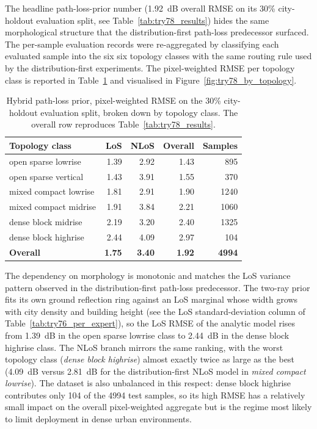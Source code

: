 The headline path-loss-prior number (\SI{1.92}{dB} overall RMSE on its
30\% city-holdout evaluation split, see Table~\ref{tab:try78_results}) hides the
same morphological structure that the distribution-first path-loss predecessor surfaced. The per-sample evaluation
records were re-aggregated by classifying each evaluated sample into the six
six topology classes with the same routing rule used by the
distribution-first experiments. The pixel-weighted RMSE per topology class is
reported in
Table~\ref{tab:try78_by_topology} and visualised in
Figure~\ref{fig:try78_by_topology}.

\begin{table}[H]
\centering
\caption[Hybrid path-loss prior RMSE by topology class.]%
{Hybrid path-loss prior, pixel-weighted RMSE on the
30\% city-holdout evaluation split, broken down by topology class. The
overall row reproduces Table~\ref{tab:try78_results}.}
\label{tab:try78_by_topology}
\footnotesize
\begin{tabularx}{\textwidth}{>{\raggedright\arraybackslash}Xrrrr}
\toprule
Topology class & LoS & NLoS & Overall & Samples \\
\midrule
open sparse lowrise   & 1.39 & 2.92 & 1.43 &  895 \\
open sparse vertical  & 1.43 & 3.91 & 1.55 &  370 \\
mixed compact lowrise & 1.81 & 2.91 & 1.90 & 1240 \\
mixed compact midrise & 1.91 & 3.84 & 2.21 & 1060 \\
dense block midrise   & 2.19 & 3.20 & 2.40 & 1325 \\
dense block highrise  & 2.44 & 4.09 & 2.97 &  104 \\
\midrule
\textbf{Overall}        & \textbf{1.75} & \textbf{3.40} & \textbf{1.92} & \textbf{4994} \\
\bottomrule
\end{tabularx}
\end{table}

The dependency on morphology is monotonic and matches the LoS variance
pattern observed in the distribution-first path-loss predecessor. The two-ray prior fits its own ground
reflection ring against an LoS marginal whose width grows with city
density and building height (see the LoS standard-deviation column of
Table~\ref{tab:try76_per_expert}), so the LoS RMSE of the analytic
model rises from \SI{1.39}{dB} in the open sparse lowrise class to
\SI{2.44}{dB} in the dense block highrise class. The NLoS branch
mirrors the same ranking, with the worst topology class
(\emph{dense block highrise}) almost exactly twice as large as the
best (\SI{4.09}{dB} versus \SI{2.81}{dB} for the distribution-first NLoS model in
\emph{mixed compact lowrise}). The dataset is also unbalanced in
this respect: dense block highrise contributes only 104 of
the 4994 test samples, so its high RMSE has a relatively small impact
on the overall pixel-weighted aggregate but is the regime most likely
to limit deployment in dense urban environments.

